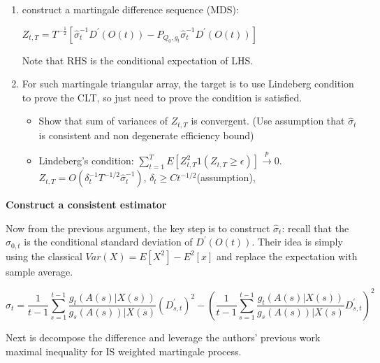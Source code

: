 \documentclass{article}
\newcommand{\smalltitle}[1]{\noindent \textbf{#1}}
\begin{document}
\begin{enumerate}
    \item construct a martingale difference sequence (MDS): 
    
    $Z_{t,T}=T^{-\frac{1}{2}}[\hat{\sigma}_t^{-1}D^\prime(O(t))-P_{Q_0,g_t}\hat{\sigma}_t^{-1}D^\prime(O(t))]$

    Note that RHS is the conditional expectation of LHS.
    \item For such martingale triangular array, the target is to use Lindeberg condition to prove the CLT, so just need to prove the condition is satisfied.
    \begin{itemize}
        \item Show that sum of variances of $Z_{t,T}$ is convergent. (Use assumption that $\hat{\sigma}_t$ is consistent and non degenerate efficiency bound) 
        \item Lindeberg's condition: $\sum_{t=1}^T E[Z_{t,T}^2 1(Z_{t,T}\geq \epsilon)] \xrightarrow{p}0$.
        $Z_{t,T}=O(\delta_t^{-1}T^{-1/2}\hat{\sigma}_t^{-1})$, $\delta_t \geq Ct^{-1/2}$(assumption), 
    \end{itemize}

\end{enumerate}

\smalltitle{Construct a consistent estimator}

Now from the previous argument, the key step is to construct $\hat{\sigma}_t$:
recall that the $\sigma_{0,t}$ is the conditional standard deviation of $D^\prime(O(t))$.
Their idea is simply using the classical $Var(X)=E[X^2]-E^2[x]$ and replace the expectation with sample average.

\begin{equation}
    \hat{\sigma}_t = \frac{1}{t-1} \sum^{t-1}_{s=1} \frac{g_t(A(s)|X(s))}{g_s(A(s))|X(s)}(D^\prime_{s,t})^2 - (\frac{1}{t-1} \sum^{t-1}_{s=1} \frac{g_t(A(s)|X(s))}{g_s(A(s))|X(s)}D^\prime_{s,t})^2
\end{equation}

Next is decompose the difference and leverage the authors' previous work maximal inequality for IS weighted martingale process.
\end{document}

